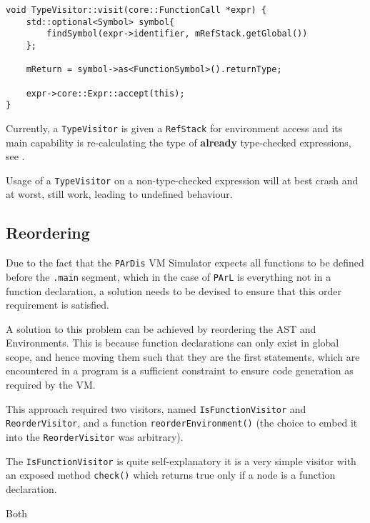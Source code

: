 \begin{lstlisting}[caption={The \texttt{visit(FunctionCall *)}
method in the \texttt{TypeVisitor} class
(ir\_gen/TypeVisitor.cpp)}, label=lst:recomputefunctype]
void TypeVisitor::visit(core::FunctionCall *expr) {
    std::optional<Symbol> symbol{
        findSymbol(expr->identifier, mRefStack.getGlobal())
    };

    mReturn = symbol->as<FunctionSymbol>().returnType;

    expr->core::Expr::accept(this);
}
\end{lstlisting}

Currently, a \texttt{TypeVisitor} is given a \texttt{RefStack}
for environment access and its main capability is re-calculating
the type of \textbf{already} type-checked expressions, see
.

\begin{marker}
Usage of a \texttt{TypeVisitor} on a non-type-checked expression
will at best crash and at worst, still work, leading to
undefined behaviour.
\end{marker}

\subsection{Reordering}

Due to the fact that the \texttt{PArDis} VM Simulator expects
all functions to be defined before the \texttt{.main} segment,
which in the case of \texttt{PArL} is everything not in a
function declaration, a solution needs to be devised to ensure
that this order requirement is satisfied.

A solution to this problem can be achieved by reordering the AST
and Environments. This is because function declarations can only
exist in global scope, and hence moving them such that they are
the first statements, which are encountered in a program is a
sufficient constraint to ensure code generation as required by
the VM.

This approach required two visitors, named
\texttt{IsFunctionVisitor} and \texttt{ReorderVisitor}, and a
function \texttt{reorderEnvironment()} (the choice to embed it
into the \texttt{ReorderVisitor} was arbitrary).

The \texttt{IsFunctionVisitor} is quite self-explanatory it is a
very simple visitor with an exposed method \texttt{check()}
which returns true only if a node is a function declaration.

Both


